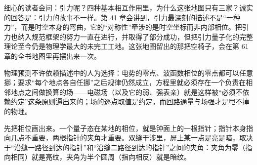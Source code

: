 \begin{mainline}
细心的读者会问：引力呢？四种基本相互作用里，为什么这张地图只有三家？诚实的回答是：引力的故事不一样。第 41 章会讲到，引力最深刻的描述不是“一种力”，而是时空本身的弯曲，它的“对称性”牵涉的是时空坐标而非内部相位。把引力也纳入规范框架的努力一直在进行，并取得了部分成功，但把引力量子化的完整理论至今仍是物理学最大的未完工工地。这张地图留出的那把空椅子，会在第 61 章的全书地图里再摆出来一次。
\end{mainline}


\begin{oneline}
物理预测不许依赖描述中的人为选择：电势的零点、波函数相位的零点都可以任意挪；要求“每个地点各自任挪”之后规律仍然成立，方程里就必须存在一个负责在相邻地点之间做换算的场——电磁场（以及它的弱、强表亲）就是这样被“必须不依赖约定”这条原则逼出来的；场的逐点取值是约定，而回路通量与场强才是甩不掉的物理。
\end{oneline}


\begin{mainline}
先把相位画出来。一个量子态在某地的相位，就是钟面上的一根指针；指针本身指向几点不重要，两根指针的夹角才重要。双缝干涉里，屏上某一点是亮是暗，取决于“沿缝一路径到达的指针”和“沿缝二路径到达的指针”之间的夹角：夹角为零（指向相同）就是亮纹，夹角为半个圆周（指向相反）就是暗纹。
\end{mainline}

\begin{center}
\end{center}

